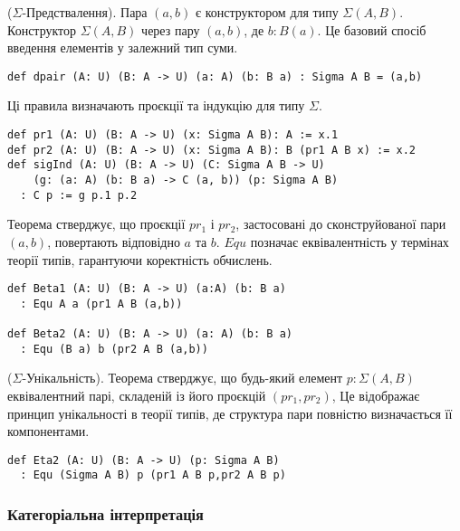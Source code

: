 \begin{definition} ($\Sigma$-Предствалення).
Пара $(a,b)$ є конструктором для типу $\Sigma(A,B)$.
Конструктор $\Sigma(A,B)$ через пару $(a,b)$, де $b:B(a)$.
Це базовий спосіб введення елементів у залежний тип суми.
\begin{lstlisting}
def dpair (A: U) (B: A -> U) (a: A) (b: B a) : Sigma A B = (a,b)
\end{lstlisting}
\end{definition}

\begin{definition}
Ці правила визначають проєкції та індукцію для типу $\Sigma$.
\begin{lstlisting}
def pr1 (A: U) (B: A -> U) (x: Sigma A B): A := x.1
def pr2 (A: U) (B: A -> U) (x: Sigma A B): B (pr1 A B x) := x.2
def sigInd (A: U) (B: A -> U) (C: Sigma A B -> U)
    (g: (a: A) (b: B a) -> C (a, b)) (p: Sigma A B)
  : C p := g p.1 p.2
\end{lstlisting}
\end{definition}

\begin{theorem}
Теорема стверджує, що проєкції $pr_1$ і $pr_2$, застосовані до сконструйованої пари $(a,b)$, повертають відповідно $a$ та $b$.
$Equ$ позначає еквівалентність у термінах теорії типів, гарантуючи коректність обчислень.
\begin{lstlisting}
def Beta1 (A: U) (B: A -> U) (a:A) (b: B a)
  : Equ A a (pr1 A B (a,b))

def Beta2 (A: U) (B: A -> U) (a: A) (b: B a)
  : Equ (B a) b (pr2 A B (a,b))
\end{lstlisting}
\end{theorem}

\begin{theorem} ($\Sigma$-Унікальність).
Теорема стверджує, що будь-який елемент $p:\Sigma(A,B)$ еквівалентний парі, складеній із його проєкцій $(pr_1,pr_2)$,
Це відображає принцип унікальності в теорії типів, де структура пари повністю визначається її компонентами.

\begin{lstlisting}
def Eta2 (A: U) (B: A -> U) (p: Sigma A B)
  : Equ (Sigma A B) p (pr1 A B p,pr2 A B p)
\end{lstlisting}
\end{theorem}

\subsubsection{Категоріальна інтерпретація}

